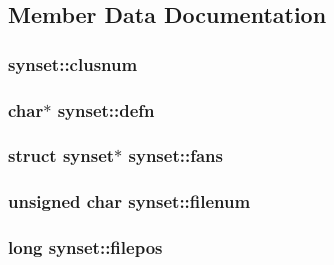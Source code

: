 \subsection{Member Data Documentation}
\subsubsection[{\texorpdfstring{clusnum}{clusnum}}]{ synset\+::clusnum}\hypertarget{structsynset_ab3c4105b791fd23aec59322c589e6878}{}\label{structsynset_ab3c4105b791fd23aec59322c589e6878}
\subsubsection[{\texorpdfstring{defn}{defn}}]{\setlength{\rightskip}{0pt plus 5cm}char$\ast$ synset\+::defn}\hypertarget{structsynset_a5d8d31dd3cd275dbcdb2e080de0c639b}{}\label{structsynset_a5d8d31dd3cd275dbcdb2e080de0c639b}
\subsubsection[{\texorpdfstring{fans}{fans}}]{\setlength{\rightskip}{0pt plus 5cm}struct {\bf synset}$\ast$ synset\+::fans}\hypertarget{structsynset_a4b6f0786fa124be59a726e1f28d5410a}{}\label{structsynset_a4b6f0786fa124be59a726e1f28d5410a}
\subsubsection[{\texorpdfstring{filenum}{filenum}}]{\setlength{\rightskip}{0pt plus 5cm}unsigned char synset\+::filenum}\hypertarget{structsynset_a4e662ac65d3322d41a86a950551c64a5}{}\label{structsynset_a4e662ac65d3322d41a86a950551c64a5}
\subsubsection[{\texorpdfstring{filepos}{filepos}}]{\setlength{\rightskip}{0pt plus 5cm}long synset\+::filepos}\hypertarget{structsynset_a5dfd3c1aea28ff9f1396f80fa0a6e253}{}\label{structsynset_a5dfd3c1aea28ff9f1396f80fa0a6e253}
